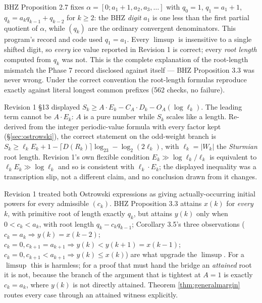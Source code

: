 \documentclass[11pt]{article}
\begin{document}
\begin{description}[leftmargin=2.5em,style=nextline]
\item[C3 --- Convergent-denominator indexing.] BHZ Proposition 2.7 fixes
$\alpha=[0;a_1+1,a_2,a_3,\dots]$ with $q_0=1$, $q_1=a_1+1$, $q_k=a_kq_{k-1}+q_{k-2}$ for $k\ge2$:
the BHZ \emph{digit} $a_1$ is one less than the first partial quotient of $\alpha$, while $(q_k)$
are the ordinary convergent denominators. This program's record and code used $q_1=a_1$. Every
$\limsup$ is insensitive to a single shifted digit, so \emph{every} $\text{ice}$ value reported in
Revision 1 is correct; every \emph{root length} computed from $q_k$ was not. This is the complete
explanation of the root-length mismatch the Phase 7 record disclosed against itself --- BHZ
Proposition 3.3 was never wrong. Under the correct convention the root-length formulas reproduce
exactly against literal longest common prefixes (562 checks, no failure).

\item[C4 --- Missing length factor in the surplus decomposition.] Revision 1 \S13 displayed
$S_k\ge A\cdot E_k-C_A\cdot D_k-O_A(\log\ell_k)$. The leading term cannot be $A\cdot E_k$: $A$ is a
pure number while $S_k$ scales like a length. Re-derived from the integer periodic-value formula
with every factor kept (\S\ref{sec:ostrowski}), the correct statement on the odd-weight branch is
$S_k\ge\ell_k E_k+1-\lceil D(R_k)\rceil\log_23-\log_2(2\ell_k)$, with $\ell_k=|W_k|$ the
\emph{Sturmian} root length. Revision 1's own flexible condition $E_k\gg\log\ell_k/\ell_k$ is
equivalent to $\ell_kE_k\gg\log\ell_k$ and so is consistent with $\ell_k\cdot E_k$; the displayed
inequality was a transcription slip, not a different claim, and no conclusion drawn from it changes.

\item[C5 --- Conditional attainment of $y(k)$.] Revision 1 treated both Ostrowski expressions as
giving actually-occurring initial powers for every admissible $(c_k)$. BHZ Proposition 3.3 attains
$x(k)$ for \emph{every} $k$, with primitive root of length exactly $q_k$, but attains $y(k)$ only
when $0<c_k<a_k$, with root length $q_k-c_kq_{k-1}$; Corollary 3.5's three observations
($c_k=a_k\Rightarrow y(k)=x(k-2)$; $c_k=0,c_{k+1}=a_{k+1}\Rightarrow y(k)<y(k+1)=x(k-1)$;
$c_k=0,c_{k+1}<a_{k+1}\Rightarrow y(k)\le x(k)$) are what upgrade the $\limsup$. For a $\limsup$
this is harmless; for a proof that must hand the bridge an \emph{attained} root it is not, because
the branch of the argument that is tightest at $A=1$ is exactly $c_k=a_k$, where $y(k)$ is not
directly attained. Theorem \ref{thm:generalmargin} routes every case through an attained witness
explicitly.

\end{description}
\end{document}
